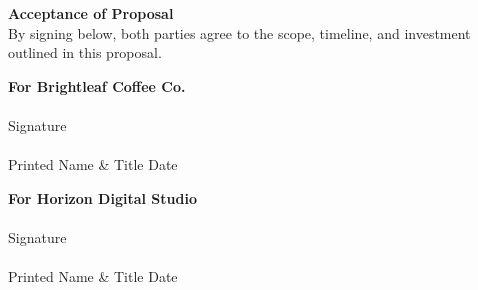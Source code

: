 \documentclass[11pt]{article}
\begin{document}
\vfill

\begin{tcolorbox}[colback=lightbg, colframe=accent, boxrule=0.6pt, arc=2pt, left=14pt, right=14pt, top=10pt, bottom=10pt]
  {\large\bfseries\color{accent} Acceptance of Proposal}\\[4pt]
  {\small\color{softgray} By signing below, both parties agree to the scope, timeline, and
  investment outlined in this proposal.}

  \vspace{1.4em}
  \noindent
  \begin{minipage}[t]{0.48\linewidth}
    \textbf{\color{accent}For Brightleaf Coffee Co.}\\[1.6em]
    \makebox[\linewidth]{\hrulefill}\\
    {\small\color{softgray}Signature}\\[1.0em]
    \makebox[\linewidth]{\hrulefill}\\
    {\small\color{softgray}Printed Name \& Title \quad\quad Date}
  \end{minipage}\hfill
  \begin{minipage}[t]{0.48\linewidth}
    \textbf{\color{accent}For Horizon Digital Studio}\\[1.6em]
    \makebox[\linewidth]{\hrulefill}\\
    {\small\color{softgray}Signature}\\[1.0em]
    \makebox[\linewidth]{\hrulefill}\\
    {\small\color{softgray}Printed Name \& Title \quad\quad Date}
  \end{minipage}
\end{tcolorbox}
\end{document}
